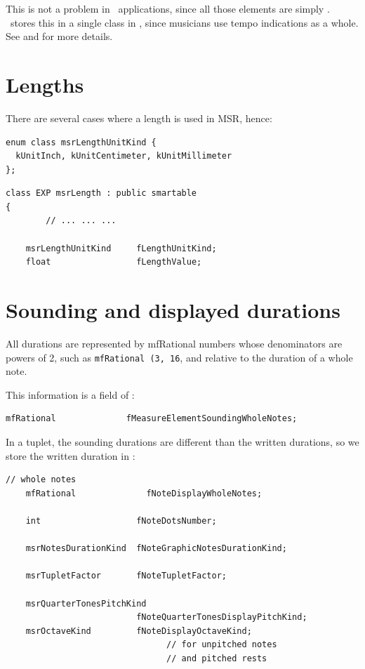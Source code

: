 This is not a problem in \GUI\ applications, since all those elements are simply \drawn. \msrRepr\ stores this in a single  class   in , since musicians use tempo indications as a whole.
See  and  for more details.


\section{Lengths}\label{Lengths}

There are several cases where a length is used in MSR, hence:
\begin{lstlisting}[language=CPlusPlus]
enum class msrLengthUnitKind {
  kUnitInch, kUnitCentimeter, kUnitMillimeter
};
\end{lstlisting}

\begin{lstlisting}[language=CPlusPlus]
class EXP msrLength : public smartable
{
		// ... ... ...

    msrLengthUnitKind     fLengthUnitKind;
    float                 fLengthValue;
\end{lstlisting}


\section{Sounding and displayed durations}\label{Sounding and displayed durations}

All durations are represented by mfRational numbers whose denominators are powers of 2, such as {\tt mfRational (3, 16}, and relative to the duration of a whole note.

This information is a field of :
\begin{lstlisting}[language=CPlusPlus]
    mfRational              fMeasureElementSoundingWholeNotes;
\end{lstlisting}

In a tuplet, the sounding durations are different than the written durations, so we store the written duration in :

\begin{lstlisting}[language=CPlusPlus]
    // whole notes
    mfRational              fNoteDisplayWholeNotes;

    int                   fNoteDotsNumber;

    msrNotesDurationKind  fNoteGraphicNotesDurationKind;

    msrTupletFactor       fNoteTupletFactor;

    msrQuarterTonesPitchKind
                          fNoteQuarterTonesDisplayPitchKind;
    msrOctaveKind         fNoteDisplayOctaveKind;
                                // for unpitched notes
                                // and pitched rests
\end{lstlisting}

